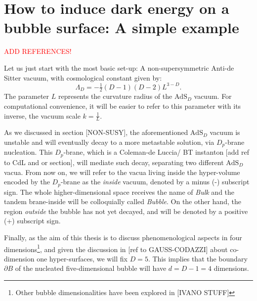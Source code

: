 \section{How to induce dark energy on a bubble surface: A simple example}\label{sec: simple_example}

\textcolor{red}{ADD REFERENCES!}

Let us just start with the most basic set-up: A non-supersymmetric Anti-de Sitter vacuum, with cosmological constant given by:
\begin{equation}\label{eq: simple_lambda}
	\Lambda_{D} = - \tfrac{1}{2}(D-1)(D-2)L^{3-D}.
\end{equation}
The parameter $L$ represents the curvature radius of the $\text{AdS}_{D}$ vacuum. For computational convenience, it will be easier to refer to this parameter with its inverse, the vacuum scale $k = \tfrac{1}{L}$.

As we discussed in section [NON-SUSY], the aforementioned $\text{AdS}_{D}$ vacuum is unstable and will eventually decay to a more metastable solution, via $D_{p}$-brane nucleation. This $D_{p}$-brane, which is a Coleman-de Luccia/ BT instanton [add ref to CdL and or section], will mediate such decay, separating two different $\text{AdS}_{D}$ vacua. From now on, we will refer to the vacua living inside the hyper-volume encoded by the $D_{p}$-brane as the \textit{inside} vacuum, denoted by a minus (-) subscript sign. The whole higher-dimensional space receives the name of \textit{Bulk} and the tandem brane-inside will be colloquially called \textit{Bubble}. On the other hand, the region \textit{outside} the bubble has not yet decayed, and will be denoted by a positive (+) subscript sign.

%	  

Finally, as the aim of this thesis is to discuss phenomenological aspects in four dimensions\footnote{Other bubble dimensionalities have been explored in [IVANO STUFF]}, and given the discussion in [ref to GAUSS-CODAZZI] about co-dimension one hyper-surfaces, we will fix $D=5$. This implies that the boundary $\partial B$ of the nucleated five-dimensional bubble will have $d = D-1 = 4$ dimensions.

